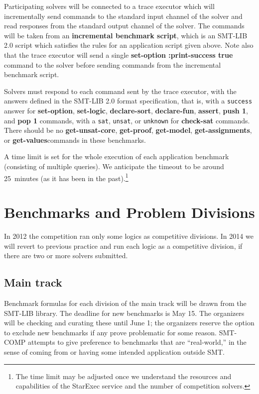 \documentclass[12pt]{article}
\newcommand{\akey}[1]{\textbf{#1}}
\begin{document}
Participating solvers will be connected to a trace executor 
which will incrementally send commands to the standard input channel of the solver
and read responses from the standard output channel of the solver.
The commands will be taken from an \textbf{incremental benchmark script},
which is an SMT-LIB 2.0 script which satisfies the rules for an application script given above.
Note also that the trace executor will send a single 
\akey{set-option :print-success true} command to the solver before 
sending commands from the incremental benchmark script.

\medskip
Solvers must respond to each command sent by the trace executor, 
with the answers defined in the SMT-LIB 2.0 format specification, that is,
with a \texttt{success} answer for 
\akey{set-option}, 
\akey{set-logic}, 
\akey{declare-sort}, 
\akey{declare-fun}, 
\akey{assert}, 
\akey{push 1}, 
and \akey{pop 1} 
commands,
 with a \texttt{sat}, \texttt{unsat}, or \texttt{unknown} 
for \akey{check-sat} commands. There should be no \akey{get-unsat-core}, \akey{get-proof}, \akey{get-model}, \akey{get-assignments}, or \akey{get-values}commands in these benchmarks.

A time limit is set for the whole execution of each application
benchmark (consisting of multiple queries).  We anticipate the
timeout to be around 25~minutes (as it has been in the past).\footnote{The time limit may be adjusted once we understand the resources and capabilities of the StarExec service and the number of competition solvers.}



\section{Benchmarks and Problem Divisions}
\label{sec:theories}

In 2012 the competition ran only some logics as competitive divisions.
In 2014 we will revert to previous practice and run each logic as a competitive division, if there are two or more solvers submitted.

\subsection{Main track}

Benchmark formulas for each division of the main track
will be drawn from the SMT-LIB library. The deadline for new benchmarks is
May 15. The organizers will be checking and curating these until June 1;
the organizers reserve the option to exclude new benchmarks if any prove problematic for some reason.
SMT-COMP
attempts to give preference to benchmarks that are ``real-world,'' in
the sense of coming from or having some intended application outside
SMT.
\end{document}
